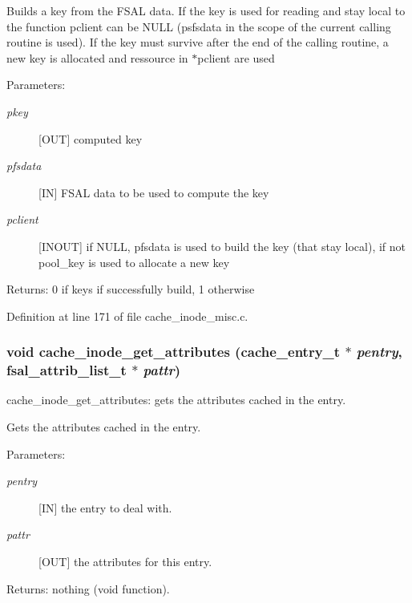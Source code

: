 Builds a key from the FSAL data. If the key is used for reading and stay local to the function pclient can be NULL (psfsdata in the scope of the current calling routine is used). If the key must survive after the end of the calling routine, a new key is allocated and ressource in $\ast$pclient are used

\begin{Desc}
\item[Parameters:]
\begin{description}
\item[{\em pkey}][OUT] computed key \item[{\em pfsdata}][IN] FSAL data to be used to compute the key \item[{\em pclient}][INOUT] if NULL, pfsdata is used to build the key (that stay local), if not pool\_\-key is used to allocate a new key \end{description}
\end{Desc}
\begin{Desc}
\item[Returns:]0 if keys if successfully build, 1 otherwise \end{Desc}


Definition at line 171 of file cache\_\-inode\_\-misc.c.
\subsubsection[{cache\_\-inode\_\-get\_\-attributes}]{\setlength{\rightskip}{0pt plus 5cm}void cache\_\-inode\_\-get\_\-attributes (cache\_\-entry\_\-t $\ast$ {\em pentry}, \/  fsal\_\-attrib\_\-list\_\-t $\ast$ {\em pattr})}\label{cache__inode__misc_8c_8b74ff8be25748ce96f1d6258409d27d}


cache\_\-inode\_\-get\_\-attributes: gets the attributes cached in the entry.

Gets the attributes cached in the entry.

\begin{Desc}
\item[Parameters:]
\begin{description}
\item[{\em pentry}][IN] the entry to deal with. \item[{\em pattr}][OUT] the attributes for this entry.\end{description}
\end{Desc}
\begin{Desc}
\item[Returns:]nothing (void function). \end{Desc}



